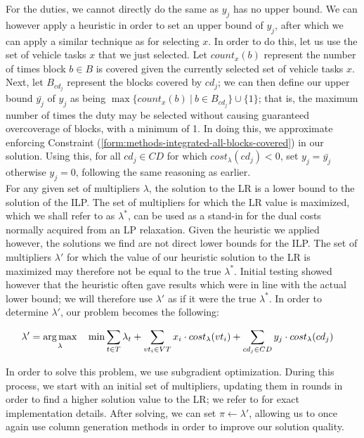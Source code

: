 \documentclass[]{article}
\begin{document}
For the duties, we cannot directly do the same as $y_j$ has no upper bound. We can however apply a heuristic in order to set an upper bound of $y_j$, after which we can apply a similar technique as for selecting $x$. In order to do this, let us use the set of vehicle tasks $x$ that we just selected. Let $\textit{count}_x(b)$ represent the number of times block $b \in B$ is covered given the currently selected set of vehicle tasks $x$. Next, let $B_{cd_j}$ represent the blocks covered by $cd_j$; we can then define our upper bound $\bar{y_{j}}$ of $y_j$ as being $\max \{ \textit{count}_x(b)\:|\:b \in B_{cd_j} \} \cup \{ 1 \}$; that is, the maximum number of times the duty may be selected without causing guaranteed overcoverage of blocks, with a minimum of 1. In doing this, we approximate enforcing Constraint (\ref{form:methods-integrated-all-blocks-covered}) in our solution. Using this, for all $cd_j \in CD$ for which $cost_\lambda(cd_j) < 0$, set $y_j = \bar{y_{j}}$ otherwise $y_j = 0$, following the same reasoning as earlier.\\

\noindent For any given set of multipliers $\lambda$, the solution to the LR is a lower bound to the solution of the ILP. The set of multipliers for which the LR value is maximized, which we shall refer to as $\lambda^*$, can be used as a stand-in for the dual costs normally acquired from an LP relaxation. Given the heuristic we applied however, the solutions we find are not direct lower bounds for the ILP. The set of multipliers $\lambda'$ for which the value of our heuristic solution to the LR is maximized may therefore not be equal to the true $\lambda^*$. Initial testing showed however that the heuristic often gave results which were in line with the actual lower bound; we will therefore use $\lambda'$ as if it were the true $\lambda^*$. In order to determine $\lambda'$, our problem becomes the following:

\begin{align}
\lambda' = \operatorname*{arg\,max}_{\lambda} \quad & \min \sum_{t \in T} \lambda_{t} + \sum_{vt_i \in VT} x_{i} \cdot cost_\lambda(vt_i) + \sum_{cd_j \in CD} y_{j} \cdot cost_\lambda(cd_j)
\end{align}

In order to solve this problem, we use subgradient optimization. During this process, we start with an initial set of multipliers, updating them in rounds in order to find a higher solution value to the LR; we refer to \citet{Beasley1993} for exact implementation details. After solving, we can set $\pi \gets \lambda'$, allowing us to once again use column generation methods in order to improve our solution quality.
\end{document}

